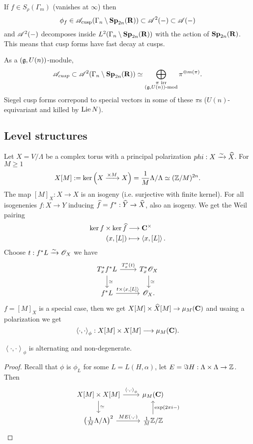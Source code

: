 If $f\in S_\rho(\Gamma_m)$ (vanishes at $\infty$) then
\[
	\phi_f\in \mathscr{A}_{\text{cusp}}(\Gamma_n\setminus\mathbf{Sp}_{2n}(\mathbf{R})) \subset \mathscr{A}^2(-) \subset \mathscr{A}(-)
\] 
and $\mathscr{A}^2(-)$ decomposes inside $L^2(\Gamma_n\setminus\mathbf{Sp}_{2n}(\mathbf{R}))$ with the action of $\mathbf{Sp}_{2n}(\mathbf{R})$. This means that cusp forms have fast decay at cusps.

As a $(\mathfrak{g},U(n))$-module,
\[
	\mathscr{A}_{cusp}\subset \mathscr{A}^2(\Gamma_n\setminus\mathbf{Sp}_{2n}(\mathbf{R})) \simeq \bigoplus_{\substack{\pi\text{ irr} \\ (\mathfrak{g},U(n))\text{-mod}}}\pi^{\oplus m(\pi)}.
\] 
Siegel cusp forms correpond to special vectors in some of these $\pi$s ($U(n)$-equivariant and killed by $\operatorname{Lie} N$).

\subsection{Level structures}
Let $X = V /\Lambda$ be a complex torus with a principal polarization $phi:X\xrightarrow{\sim} \widehat{X}$. For $M\ge 1$ 
\[
	X[M] := \operatorname{ker}\left( X\xrightarrow{\times M}X \right) = \frac{1}{M}\Lambda /\Lambda \simeq (\mathbb Z /M)^{2n}.
\] 
The map $[M]_X:X\to X$ is an isogeny (i.e. surjective with finite kernel). For all isogenenies $f:X\to Y$ inducing $\wh{f}=f^{*}:\wh{Y}\to \wh{X}$, also an isogeny. We get the Weil pairing
\begin{align*}
	\operatorname{ker} f\times \operatorname{ker}\widehat{f} &\longrightarrow \mathbf{C}^{\times} \\
	(x,[L]) &\longmapsto \left<x,[L] \right>
.\end{align*}
Choose $t:f^{*}L\xrightarrow{\sim} \mathscr{O}_X$ we have
\[
\begin{tikzcd}
	T_x^{*}f^{*}L \ar[r,"{T_x^{*}(t)}"] \ar[d,"\isoto"] & T_x^{*}\OO_X \ar[d,"\isoto"] \\
	f^{*}L \ar[r,"{t\times \left<x,[L] \right>}"] & \OO_X.
\end{tikzcd}
\] 
$f=[M]_X$ is a special case, then we get $X[M]\times \wh{X}[M]\to \mu_M(\C)$ and usaing a polarization we get
\[
	\left<\cdot ,\cdot  \right>_\phi:X[M]\times X[M]\to \mu_M(\C).
\] 
\begin{proposition}
	$\left<\cdot ,\cdot  \right>_\phi$ is alternating and non-degenerate.
\end{proposition}
\begin{proof}
	Recall that $\phi$ is $\phi_L$ for some $L=L(H,\alpha)$, let $E=\Im H:\Lambda\times \Lambda\to \Z$. Then
	\[
	\begin{tikzcd}
		X[M] \times X[M] \ar[r,"{\left<\cdot ,\cdot  \right>_\phi}"] \ar[d,"\isoto"] & \mu_M(\C) \\
		\left( \frac{1}{M}\Lambda /\Lambda \right) ^2 \ar[r,"{ME(\cdot ,\cdot )}"] & \frac{1}{M}\Z /\Z \ar[u,"{\exp(2\pi i -)}"']
	\end{tikzcd}
	\] 
\end{proof}
